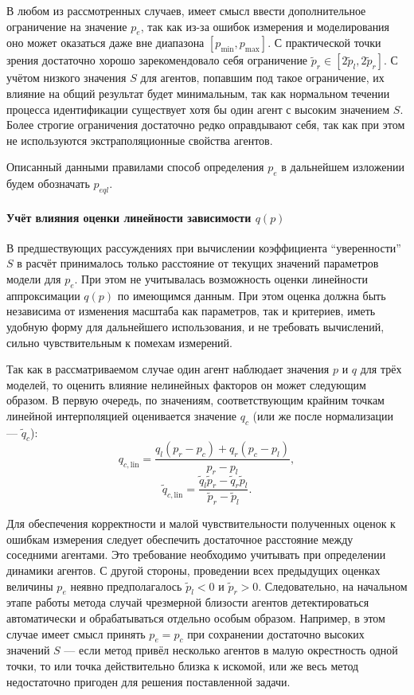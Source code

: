 В любом из рассмотренных случаев, имеет смысл ввести дополнительное ограничение
на значение $p_e$, так как из-за ошибок измерения и моделирования
оно может оказаться даже вне диапазона $[p_{\min}, p_{\max}]$.
С практической точки зрения достаточно хорошо зарекомендовало себя ограничение
$ \tilde{p}_r \in [2\tilde{p}_l, 2\tilde{p}_r ]$.
С учётом низкого значения $S$ для агентов, попавшим под такое ограничение,
их влияние на общий результат будет минимальным,
так как нормальном течении процесса идентификации существует
хотя бы один агент с высоким значением $S$.
Более строгие ограничения достаточно редко оправдывают себя,
так как при этом не используются экстраполяционные свойства агентов.

Описанный данными правилами способ
определения
$p_e$ в дальнейшем изложении будем обозначать $p_{eql}$\label{atu:d:p_eql}.

\paragraph{Учёт влияния оценки линейности зависимости $q(p)$}

В предшествующих рассуждениях при вычислении коэффициента ``уверенности'' $S$
в расчёт принималось только расстояние от текущих значений параметров модели для $p_e$.
При этом не учитывалась возможность оценки линейности аппроксимации $q(p)$
по имеющимся данным. При этом оценка должна быть независима от изменения масштаба
как параметров, так и критериев, иметь удобную форму для дальнейшего
использования, и не требовать вычислений, сильно чувствительным к помехам измерений.

Так как в рассматриваемом случае один агент наблюдает значения $p$ и $q$
для трёх моделей, то оценить влияние нелинейных факторов он может
следующим образом. В первую очередь, по значениям, соответствующим крайним точкам
линейной интерполяцией оценивается значение $q_c$ (или же после нормализации --- $\tilde{q}_c$):
%
\begin{equation}
 q_{c,\mathrm{lin}}
  =
  \frac{  q_l \left( p_r - p_c \right) + q_r \left( p_c - p_l \right) }{p_r-p_l},
  \label{atu:eq:q_clin}
\end{equation}
%
\begin{equation}
  \tilde{q}_{c,\mathrm{lin}}
  =
  \frac{ \tilde{q}_l \tilde{p}_r - \tilde{q}_r \tilde{p}_l }{\tilde{p}_r-\tilde{p}_l}  .
  \label{atu:eq:qr_clin}
\end{equation}

Для обеспечения корректности и малой чувствительности полученных оценок
к ошибкам измерения следует обеспечить достаточное расстояние между соседними агентами.
Это требование необходимо учитывать при определении динамики агентов.
С другой стороны, проведении всех предыдущих оценках величины $p_e$
неявно предполагалось $\tilde{p}_l < 0$ и $\tilde{p}_r > 0$.
Следовательно, на начальном этапе работы метода случай чрезмерной близости агентов
детектироваться автоматически и обрабатываться отдельно особым образом.
Например, в этом случае имеет смысл принять $p_e = p_c$
при сохранении достаточно высоких значений $S$ --- если метод привёл
несколько агентов в малую окрестность одной точки, то
или точка действительно близка к искомой, или же весь метод
недостаточно пригоден для решения поставленной задачи.


